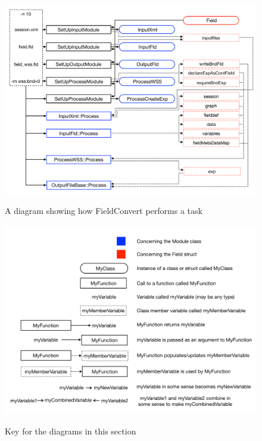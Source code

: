 \begin{figure}[htbp]
\centering
\includegraphics[width=\linewidth]{utilities/img/FieldConvertNew.pdf}
\label{fig:fieldconvert}
\caption{A diagram showing how FieldConvert performs a task} 
\end{figure}

\begin{figure}[htbp]
\centering
\includegraphics[width=\linewidth]{utilities/img/Key.pdf}
\label{fig:fieldconvertkey}
\caption{Key for the diagrams in this section} 
\end{figure}












